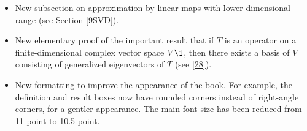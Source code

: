 \begin{itemize}
\item
New subsection on approximation by linear maps with lower-dimensional range (see Section \ref{9SVD}).

\item
New elementary proof of the important result that if $T$ is an operator on a finite-dimensional complex vector space $V\1$, then there exists a basis of $V$ consisting of generalized eigenvectors of $T$ (see \ref{28}).

\item
New formatting to improve the appearance of the book. For example, the definition and result boxes now have rounded corners instead of right-angle corners, for a gentler appearance. The main font size has been reduced from 11 point to 10.5 point.

\end{itemize}


\clearpage


\endinput 